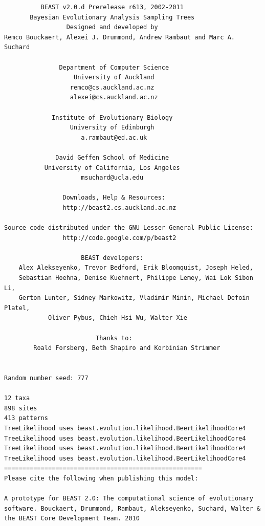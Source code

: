 \documentclass[11pt]{article}
\theoremstyle{plain}%
\theoremstyle{definition}
\theoremstyle{remark}
\begin{document}
{\scriptsize   
\begin{verbatim}
          BEAST v2.0.d Prerelease r613, 2002-2011
       Bayesian Evolutionary Analysis Sampling Trees
                 Designed and developed by
Remco Bouckaert, Alexei J. Drummond, Andrew Rambaut and Marc A. Suchard
                              
               Department of Computer Science
                   University of Auckland
                  remco@cs.auckland.ac.nz
                  alexei@cs.auckland.ac.nz
                              
             Institute of Evolutionary Biology
                  University of Edinburgh
                     a.rambaut@ed.ac.uk
                              
              David Geffen School of Medicine
           University of California, Los Angeles
                     msuchard@ucla.edu
                              
                Downloads, Help & Resources:
              	http://beast2.cs.auckland.ac.nz
                              
Source code distributed under the GNU Lesser General Public License:
              	http://code.google.com/p/beast2
                              
                     BEAST developers:
	Alex Alekseyenko, Trevor Bedford, Erik Bloomquist, Joseph Heled, 
	Sebastian Hoehna, Denise Kuehnert, Philippe Lemey, Wai Lok Sibon Li, 
	Gerton Lunter, Sidney Markowitz, Vladimir Minin, Michael Defoin Platel, 
          	Oliver Pybus, Chieh-Hsi Wu, Walter Xie
                              
                         Thanks to:
    	Roald Forsberg, Beth Shapiro and Korbinian Strimmer


Random number seed: 777

12 taxa
898 sites
413 patterns
TreeLikelihood uses beast.evolution.likelihood.BeerLikelihoodCore4
TreeLikelihood uses beast.evolution.likelihood.BeerLikelihoodCore4
TreeLikelihood uses beast.evolution.likelihood.BeerLikelihoodCore4
TreeLikelihood uses beast.evolution.likelihood.BeerLikelihoodCore4
======================================================
Please cite the following when publishing this model:

A prototype for BEAST 2.0: The computational science of evolutionary software. Bouckaert, Drummond, Rambaut, Alekseyenko, Suchard, Walter & the BEAST Core Development Team. 2010


\end{verbatim}}
\end{document}
